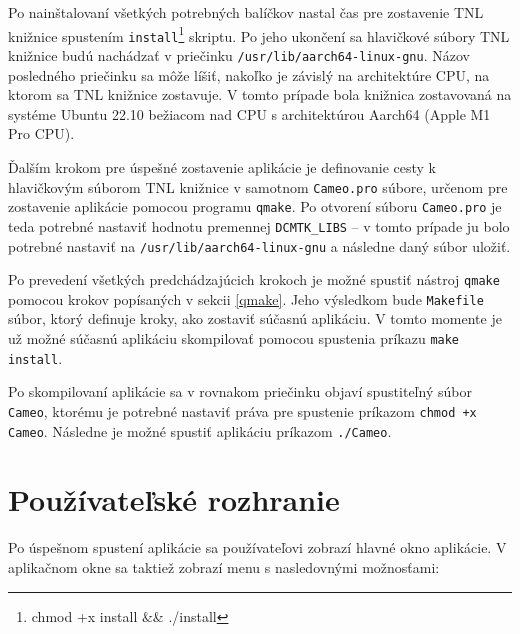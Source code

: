 {Po nainštalovaní všetkých potrebných balíčkov nastal čas pre zostavenie TNL knižnice spustením \texttt{install}\footnote{chmod +x install \&\& ./install} skriptu. Po jeho ukončení sa hlavičkové súbory TNL knižnice budú nachádzať v priečinku \texttt{/usr/lib/aarch64-linux-gnu}. Názov posledného priečinku sa môže líšiť, nakoľko je závislý na architektúre CPU, na ktorom sa TNL knižnice zostavuje. V tomto prípade bola knižnica zostavovaná na systéme Ubuntu 22.10 bežiacom nad CPU s architektúrou Aarch64 (Apple M1 Pro CPU).

Ďalším krokom pre úspešné zostavenie aplikácie je definovanie cesty k hlavičkovým súborom TNL knižnice v samotnom \texttt{Cameo.pro} súbore, určenom pre zostavenie aplikácie pomocou programu \texttt{qmake}. Po otvorení súboru \texttt{Cameo.pro} je teda potrebné nastaviť hodnotu premennej \lstinline{DCMTK_LIBS} -- v tomto prípade ju bolo potrebné nastaviť na \texttt{/usr/lib/aarch64-linux-gnu} a následne daný súbor uložiť.

Po prevedení všetkých predchádzajúcich krokoch je možné spustiť nástroj \texttt{qmake} pomocou krokov popísaných v sekcii \ref{qmake}. Jeho výsledkom bude \texttt{Makefile} súbor, ktorý definuje kroky, ako zostaviť súčasnú aplikáciu. V tomto momente je už možné súčasnú aplikáciu skompilovať pomocou spustenia príkazu \texttt{make install}.

Po skompilovaní aplikácie sa v rovnakom priečinku objaví spustiteľný súbor \texttt{Cameo}, ktorému je potrebné nastaviť práva pre spustenie príkazom \texttt{chmod +x Cameo}. Následne je možné spustiť aplikáciu príkazom \texttt{./Cameo}. \clearpage

\section {Používateľské rozhranie}\label{old_ui}
Po úspešnom spustení aplikácie sa používateľovi zobrazí hlavné okno aplikácie.
V aplikačnom okne sa taktiež zobrazí menu s nasledovnými možnosťami:

}
